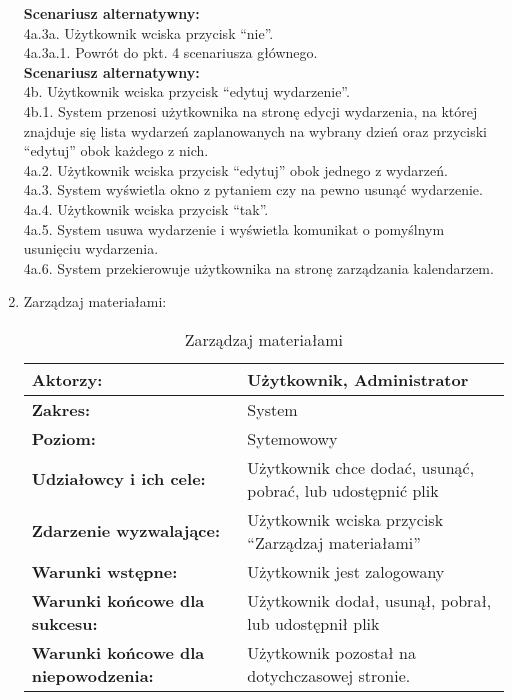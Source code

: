\begin{enumerate}[label=(\Roman*)]
\textbf{Scenariusz alternatywny:}\\
4a.3a. Użytkownik wciska przycisk “nie”.\\
4a.3a.1. Powrót do pkt. 4 scenariusza głównego.\\
\textbf{Scenariusz alternatywny:}\\
4b. Użytkownik wciska przycisk “edytuj wydarzenie”.\\
4b.1. System przenosi użytkownika na stronę edycji wydarzenia, na której znajduje się lista
wydarzeń zaplanowanych na wybrany dzień oraz przyciski “edytuj” obok każdego z nich.\\
4a.2. Użytkownik wciska przycisk “edytuj” obok jednego z wydarzeń.\\
4a.3. System wyświetla okno z pytaniem czy na pewno usunąć wydarzenie.\\
4a.4. Użytkownik wciska przycisk “tak”.\\
4a.5. System usuwa wydarzenie i wyświetla komunikat o pomyślnym usunięciu wydarzenia.\\
4a.6. System przekierowuje użytkownika na stronę zarządzania kalendarzem.\\

\item Zarządzaj materiałami:
	\begin{table}[H]
\centering
\caption{Zarządzaj materiałami}
\label{zarządzajmaterialami:}
\begin{tabular}{|p{7cm}|p{7cm}|}
  \hline 
  \textbf{Aktorzy:} & Użytkownik, Administrator\\
  \hline
  \textbf{Zakres:} & System \\
	\hline
  \textbf{Poziom:} & Sytemowowy \\
	\hline
  \textbf{Udziałowcy i ich cele: } & Użytkownik chce dodać, usunąć, pobrać, lub udostępnić plik \\
	\hline
  \textbf{Zdarzenie wyzwalające: } & Użytkownik wciska przycisk “Zarządzaj materiałami” \\
	\hline
  \textbf{Warunki wstępne: } & Użytkownik jest zalogowany
 \\
	\hline
  \textbf{Warunki końcowe dla sukcesu:} &Użytkownik dodał, usunął, pobrał, lub udostępnił plik
 \\
	\hline
  \textbf{Warunki końcowe dla niepowodzenia:} & Użytkownik pozostał na dotychczasowej stronie. \\
  \hline
\end{tabular} 
\end{table}


\end{enumerate}
